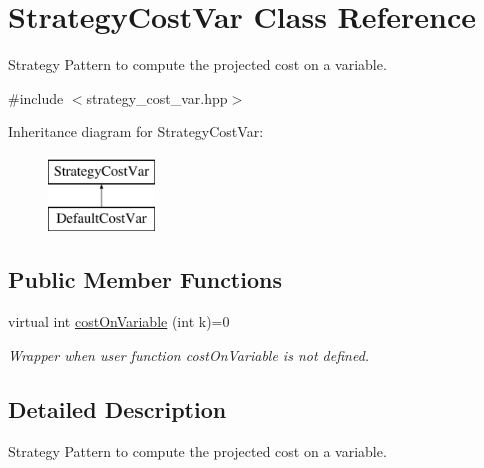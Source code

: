 \hypertarget{classStrategyCostVar}{\section{\-Strategy\-Cost\-Var \-Class \-Reference}
\label{classStrategyCostVar}
}


\-Strategy \-Pattern to compute the projected cost on a variable.  




{\ttfamily \#include $<$strategy\-\_\-cost\-\_\-var.\-hpp$>$}

\-Inheritance diagram for \-Strategy\-Cost\-Var\-:\begin{figure}[H]
\begin{center}
\leavevmode
\includegraphics[height=2.000000cm]{classStrategyCostVar}
\end{center}
\end{figure}
\subsection*{\-Public \-Member \-Functions}
\begin{DoxyCompactItemize}
\item 
virtual int \hyperlink{classStrategyCostVar_a8381829dfa84b3460822aa0e3677a443}{cost\-On\-Variable} (int k)=0
\begin{DoxyCompactList}\small\item\em \-Wrapper when user function cost\-On\-Variable is not defined. \end{DoxyCompactList}\end{DoxyCompactItemize}


\subsection{\-Detailed \-Description}
\-Strategy \-Pattern to compute the projected cost on a variable. 

